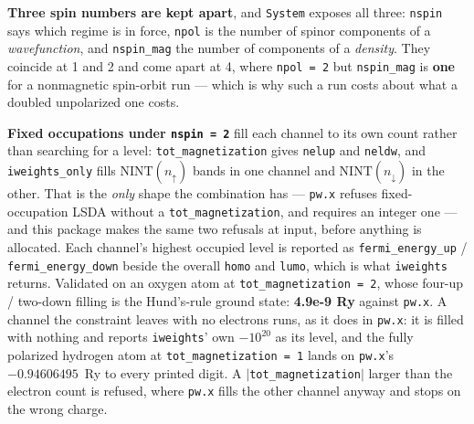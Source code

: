 \documentclass[11pt,a4paper]{article}
\newcommand{\code}[1]{\texttt{\small #1}}
\begin{document}
\textbf{Three spin numbers are kept apart}, and \code{System} exposes all three:
\code{nspin} says which regime is in force, \code{npol} is the number of spinor
components of a \emph{wavefunction}, and \code{nspin\_mag} the number of
components of a \emph{density}. They coincide at 1 and 2 and come apart at 4,
where \code{npol = 2} but \code{nspin\_mag} is \textbf{one} for a nonmagnetic
spin-orbit run --- which is why such a run costs about what a doubled
unpolarized one costs.

\textbf{Fixed occupations under \code{nspin = 2}} fill each channel to its own
count rather than searching for a level: \code{tot\_magnetization} gives
\code{nelup} and \code{neldw}, and \code{iweights\_only} fills
$\mathrm{NINT}(n_\uparrow)$ bands in one channel and $\mathrm{NINT}(n_\downarrow)$
in the other. That is the \emph{only} shape the combination has ---
\code{pw.x} refuses fixed-occupation LSDA without a \code{tot\_magnetization},
and requires an integer one --- and this package makes the same two refusals at
input, before anything is allocated. Each channel's highest occupied level is
reported as \code{fermi\_energy\_up} / \code{fermi\_energy\_down} beside the
overall \code{homo} and \code{lumo}, which is what \code{iweights} returns.
Validated on an oxygen atom at \code{tot\_magnetization = 2}, whose four-up /
two-down filling is the Hund's-rule ground state: \textbf{4.9e-9 Ry} against
\code{pw.x}. A channel the constraint leaves with no electrons runs, as it does in
\code{pw.x}: it is filled with nothing and reports \code{iweights}' own $-10^{20}$
as its level, and the fully polarized hydrogen atom at
\code{tot\_magnetization = 1} lands on \code{pw.x}'s $-0.94606495$~Ry to every
printed digit. A $|$\code{tot\_magnetization}$|$ larger than the electron count
is refused, where \code{pw.x} fills the other channel anyway and stops on the
wrong charge.
\end{document}
